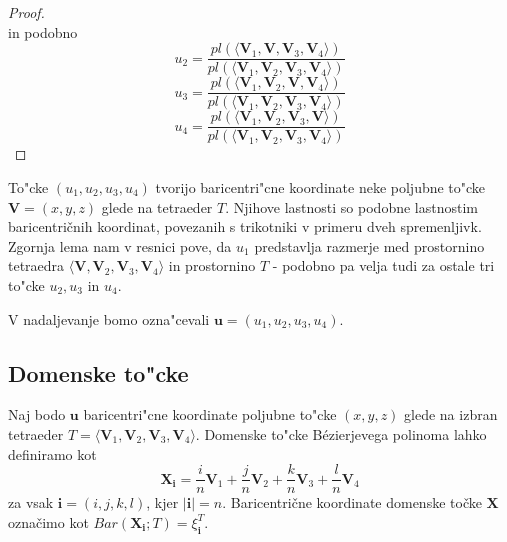 \documentclass[12pt,a4paper]{amsart}
\theoremstyle{definition} %
\theoremstyle{plain} %
\begin{document}
\begin{proof}
$$$$
in podobno 
$$
u_{2} = \frac{pl(\langle\textbf{V}_{1}, \textbf{V}, \textbf{V}_{3}, \textbf{V}_{4}\rangle)}{pl(\langle\textbf{V}_{1}, \textbf{V}_{2}, \textbf{V}_{3}, \textbf{V}_{4}\rangle)}
$$
\vspace{2mm}
$$
u_{3} = \frac{pl(\langle\textbf{V}_{1}, \textbf{V}_{2}, \textbf{V}, \textbf{V}_{4}\rangle)}{pl(\langle\textbf{V}_{1}, \textbf{V}_{2}, \textbf{V}_{3}, \textbf{V}_{4}\rangle)}
$$
\vspace{2mm}
$$
u_{4} = \frac{pl(\langle\textbf{V}_{1}, \textbf{V}_{2}, \textbf{V}_{3}, \textbf{V}\rangle)}{pl(\langle\textbf{V}_{1}, \textbf{V}_{2}, \textbf{V}_{3}, \textbf{V}_{4}\rangle)}
$$
\end{proof}
To"cke $(u_{1}, u_{2}, u_{3}, u_{4})$ tvorijo baricentri"cne koordinate neke poljubne to"cke $\textbf{V} = (x, y, z)$ glede na tetraeder $T$. 
Njihove lastnosti so podobne lastnostim baricentričnih koordinat, povezanih s trikotniki v primeru dveh spremenljivk. 
Zgornja lema nam v resnici pove, da $u_{1}$ predstavlja razmerje med prostornino tetraedra $\langle\textbf{V}, \textbf{V}_{2}, \textbf{V}_{3}, \textbf{V}_{4}\rangle$ 
in prostornino $T$ - podobno pa velja tudi za ostale tri to"cke $u_{2}, u_{3}$ in $u_{4}$. 

V nadaljevanje bomo ozna"cevali $\textbf{u} = (u_{1}, u_{2}, u_{3}, u_{4})$. 

\subsection{Domenske to"cke}
Naj bodo $\textbf{u}$ baricentri"cne koordinate poljubne to"cke $(x, y, z)$ 
glede na izbran tetraeder $T = \langle\textbf{V}_{1}, \textbf{V}_{2}, \textbf{V}_{3}, \textbf{V}_{4}\rangle$. 
Domenske to"cke Bézierjevega polinoma lahko definiramo kot
$$
\textbf{X}_{\textbf{i}} = \frac{i}{n}\textbf{V}_{1} + \frac{j}{n}\textbf{V}_{2} + \frac{k}{n}\textbf{V}_{3} + \frac{l}{n}\textbf{V}_{4}
$$
za vsak $\textbf{i} = (i, j, k, l)$, kjer $|\textbf{i}| = n$. 
Baricentrične koordinate domenske točke 
$\textbf{X}$ označimo kot $Bar(\textbf{X}_{\textbf{i}}; T) = \xi^{T}_{\textbf{i}}$.\\
\end{document}
